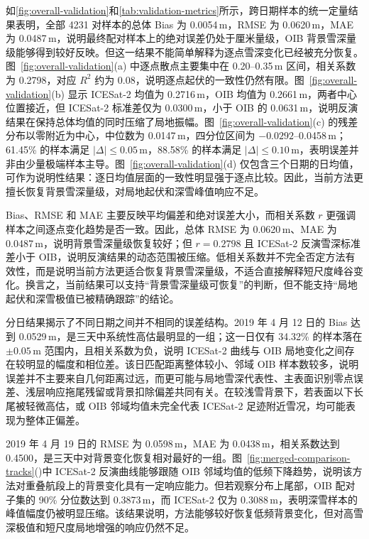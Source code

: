 如\autoref{fig:overall-validation}和\autoref{tab:validation-metrics}所示，跨日期样本的统一定量结果表明，全部 4231 对样本的总体 Bias 为 0.0054\,m，RMSE 为 0.0620\,m，MAE 为 0.0487\,m，说明最终配对样本上的绝对误差仍处于厘米量级，OIB 背景雪深量级能够得到较好反映。但这一结果不能简单解释为逐点雪深变化已经被充分恢复。图~\ref{fig:overall-validation}(a) 中逐点散点主要集中在 0.20--0.35\,m 区间，相关系数为 0.2798，对应 $R^2$ 约为 0.08，说明逐点起伏的一致性仍然有限。图~\ref{fig:overall-validation}(b) 显示 ICESat-2 均值为 0.2716\,m，OIB 均值为 0.2661\,m，两者中心位置接近，但 ICESat-2 标准差仅为 0.0300\,m，小于 OIB 的 0.0631\,m，说明反演结果在保持总体均值的同时压缩了局地振幅。图~\ref{fig:overall-validation}(c) 的残差分布以零附近为中心，中位数为 0.0147\,m，四分位区间为 $-0.0292$--0.0458\,m；61.45\% 的样本满足 $\lvert\Delta\rvert \leq 0.05$\,m，88.58\% 的样本满足 $\lvert\Delta\rvert \leq 0.10$\,m，表明误差并非由少量极端样本主导。图~\ref{fig:overall-validation}(d) 仅包含三个日期的日均值，可作为说明性结果：逐日均值层面的一致性明显强于逐点比较。因此，当前方法更擅长恢复背景雪深量级，对局地起伏和深雪峰值响应不足。

Bias、RMSE 和 MAE 主要反映平均偏差和绝对误差大小，而相关系数 \(r\) 更强调样本之间逐点变化趋势是否一致。因此，总体 RMSE 为 0.0620\,m、MAE 为 0.0487\,m，说明背景雪深量级恢复较好；但 \(r=0.2798\) 且 ICESat-2 反演雪深标准差小于 OIB，说明反演结果的动态范围被压缩。低相关系数并不完全否定方法有效性，而是说明当前方法更适合恢复背景雪深量级，不适合直接解释短尺度峰谷变化。换言之，当前结果可以支持“背景雪深量级可恢复”的判断，但不能支持“局地起伏和深雪极值已被精确跟踪”的结论。

分日结果揭示了不同日期之间并不相同的误差结构。2019 年 4 月 12 日的 Bias 达到 0.0529\,m，是三天中系统性高估最明显的一组；这一日仅有 34.32\% 的样本落在 $\pm 0.05$\,m 范围内，且相关系数为负，说明 ICESat-2 曲线与 OIB 局地变化之间存在较明显的幅度和相位差。该日匹配距离整体较小、邻域 OIB 样本数较多，说明误差并不主要来自几何距离过远，而更可能与局地雪深代表性、主表面识别零点误差、浅层响应拖尾残留或背景扣除偏差共同有关。在较浅雪背景下，若表面以下长尾被轻微高估，或 OIB 邻域均值未完全代表 ICESat-2 足迹附近雪况，均可能表现为整体正偏差。

2019 年 4 月 19 日的 RMSE 为 0.0598\,m，MAE 为 0.0438\,m，相关系数达到 0.4500，是三天中对背景变化恢复相对最好的一组。图~\ref{fig:merged-comparison-tracks}()中 ICESat-2 反演曲线能够跟随 OIB 邻域均值的低频下降趋势，说明该方法对重叠航段上的背景变化具有一定响应能力。但若观察分布上尾部，OIB 配对子集的 90\% 分位数达到 0.3873\,m，而 ICESat-2 仅为 0.3088\,m，表明深雪样本的峰值幅度仍被明显压缩。该结果说明，方法能够较好恢复低频背景变化，但对高雪深极值和短尺度局地增强的响应仍然不足。


